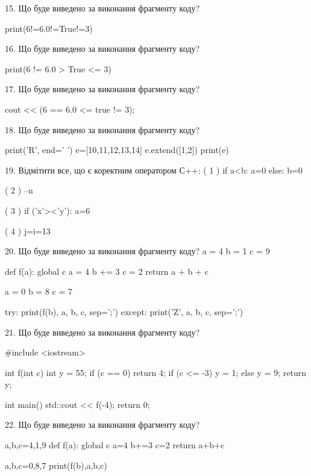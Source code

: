 \documentclass[11pt]{article}
\begin{document}
15. Що буде виведено за виконання фрагменту коду?

print(6!=6.0!=True!=3)


16. Що буде виведено за виконання фрагменту коду?

print(6 != 6.0 > True <= 3)


17. Що буде виведено за виконання фрагменту коду?

cout << (6 == 6.0 <= true != 3);


18. Що буде виведено за виконання фрагменту коду?

print('R', end=' ')
e=[10,11,12,13,14]
e.extend([1,2])
print(e)



19. %
Відмітити все, що є коректним оператором С++:
( 1 ) if a<b: a=0 else: b=0

( 2 ) --n

( 3 ) if ('x'><'y'): a=6

( 4 ) j=i=13


20. Що буде виведено за виконання фрагменту коду?
a = 4
b = 1
c = 9

def f(a):
global c    a = 4
    b += 3
    c = 2
    return a + b + c

a = 0
b = 8
c = 7

try:
    print(f(b), a, b, c, sep=';')
except:
    print('Z', a, b, c, sep=';')


21. Що буде виведено за виконання фрагменту коду?

#include <iostream>

int f(int c){
    int y = 55;
    if (c == 0) 
        return 4;
    if (c <= -3)
         y = 1;
    else
         y = 9;
    return y;
}

int main(){
    std::cout << f(-4);
    return 0;
}



22. Що буде виведено за виконання фрагменту коду?

a,b,c=4,1,9
def f(a):
global c    a=4
    b+=3
    c=2
    return a+b+c

a,b,c=0,8,7
print(f(b),a,b,c)
\end{document}
